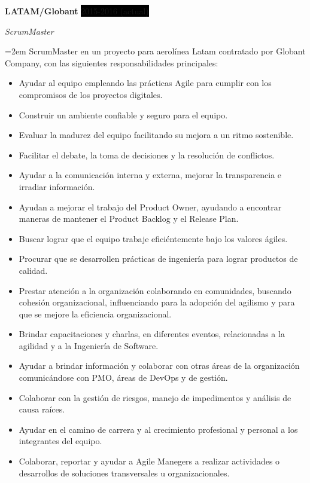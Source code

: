 \documentclass[paper=a4,fontsize=11pt]{scrartcl} %
\newcommand{\sepspace}{\vspace*{1em}}		%
\newcommand{\EducationEntry}[4]{
		\noindent \textbf{#1} \hfill      %
		\colorbox{Black}{%
			\parbox{6em}{%
			\hfill\color{White}#2}} \par  %
		\noindent \textit{#3} \par        %
		\noindent\hangindent=2em\hangafter=0 \small #4 %
		\normalsize \par}
\newcommand{\WorkEntry}[4]{				  %
		\noindent \textbf{#1} \hfill      %
		\colorbox{Black}{\color{White}#2} \par  %
		\noindent \textit{#3} \par              %
		\noindent\hangindent=2em\hangafter=0 \small #4 %
		\normalsize \par}
\begin{document}
\WorkEntry{LATAM/Globant}{2015-2016 (actual)}{ScrumMaster}
{ScrumMaster en un proyecto para aerolínea Latam contratado por Globant Company, con las siguientes responsabilidades principales:
\begin{itemize}
\item Ayudar al equipo empleando las prácticas Agile para cumplir con los compromisos de los proyectos digitales.
\item Construir un ambiente confiable y seguro para el equipo.
\item Evaluar la madurez del equipo facilitando su mejora a un ritmo sostenible.
\item Facilitar el debate, la toma de decisiones y la resolución de conflictos.
\item Ayudar a la comunicación interna y externa, mejorar la transparencia e irradiar información.
\item Ayudan a mejorar el trabajo del Product Owner, ayudando a encontrar maneras de mantener el Product Backlog y el Release Plan.
\item Buscar lograr que el equipo trabaje eficiéntemente bajo los valores ágiles.
\item Procurar que se desarrollen prácticas de ingeniería para lograr productos de calidad.
\item Prestar atención a la organización colaborando en comunidades, buscando cohesión organizacional, influenciando para la adopción del agilismo y para que se mejore la eficiencia organizacional.
\item Brindar capacitaciones y charlas, en diferentes eventos, relacionadas a la agilidad y a la Ingeniería de Software.
\item Ayudar a brindar información y colaborar con otras áreas de la organización comunicándose con PMO, áreas de DevOps y de gestión.
\item Colaborar con la gestión de riesgos, manejo de impedimentos y análisis de causa raíces.
\item Ayudar en el camino de carrera y al crecimiento profesional y personal a los integrantes del equipo.
\item Colaborar, reportar y ayudar a Agile Manegers a realizar actividades o desarrollos de soluciones transversales u organizacionales.
\end{itemize}
}

\sepspace
\end{document}
